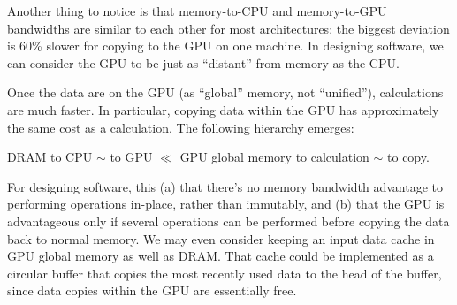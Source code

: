 \documentclass[12pt]{article}
\begin{document}


Another thing to notice is that memory-to-CPU and memory-to-GPU bandwidths are similar to each other for most architectures: the biggest deviation is 60\% slower for copying to the GPU on one machine. In designing software, we can consider the GPU to be just as ``distant'' from memory as the CPU.

Once the data are on the GPU (as ``global'' memory, not ``unified''), calculations are much faster. In particular, copying data within the GPU has approximately the same cost as a calculation. The following hierarchy emerges:
\begin{center}
DRAM to CPU $\sim$ to GPU $\ll$ GPU global memory to calculation $\sim$ to copy.
\end{center}
For designing software, this (a) that there's no memory bandwidth advantage to performing operations in-place, rather than immutably, and (b) that the GPU is advantageous only if several operations can be performed before copying the data back to normal memory. We may even consider keeping an input data cache in GPU global memory as well as DRAM. That cache could be implemented as a circular buffer that copies the most recently used data to the head of the buffer, since data copies within the GPU are essentially free.
\end{document}
